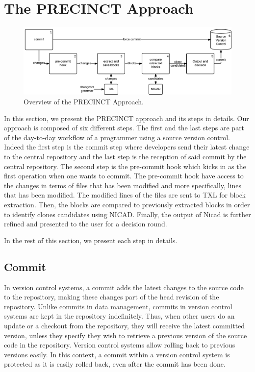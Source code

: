 \documentclass[conference]{IEEEtran}
\begin{document}
\section{The PRECINCT Approach}
\label{sec:The PRECINCT Approach}

\begin{figure}
  \centering
    \includegraphics[width=\textwidth]{media/approach.png}
    \caption{ Overview of the PRECINCT Approach.\label{fig:precinct-approach}}
\end{figure}

In this section, we present the PRECINCT approach and its steps in details. Our approach is composed of six different steps.
The first and the last steps are part of the day-to-day workflow of a programmer using a source version control.
Indeed the first step is the commit step where developers send their latest change to the central repository and the last step is the reception of said commit by the central repository.
The second step is the pre-commit hook which kicks in as the first operation when one wants to commit.
The pre-commit hook have access to the changes in terms of files that has been modified and more specifically, lines that has been modified.
The modified lines of the files are sent to TXL\cite{Cordy2006a} for block extraction.
Then, the blocks are compared to previously extracted blocks in order to identify clones candidates using NICAD\cite{Cordy2011}.
Finally, the output of Nicad is further refined and presented to the user for a decision round.

In the rest of this section, we present each step in details.

\subsection{Commit}
\label{sub:Commit}

In version control systems, a commit adds the latest changes to the source code to the repository, making these changes part of the head revision of the repository.
Unlike commits in data management, commits in version control systems are kept in the repository indefinitely.
Thus, when other users do an update or a checkout from the repository, they will receive the latest committed version, unless they specify they wish to retrieve a previous version of the source code in the repository.
Version control systems allow rolling back to previous versions easily. In this context, a commit within a version control system is protected as it is easily rolled back, even after the commit has been done.
\end{document}
